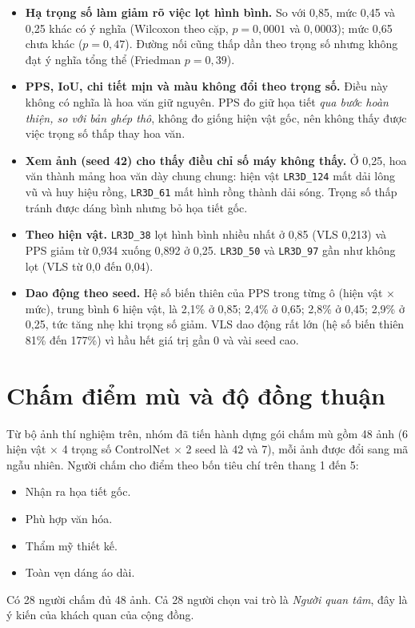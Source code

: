 \documentclass[12pt,a4paper]{report}
\begin{document}
\begin{itemize}
  \item \textbf{Hạ trọng số làm giảm rõ việc lọt hình bình.} So với 0,85, mức 0,45 và 0,25 khác có ý nghĩa (Wilcoxon theo cặp, $p=0{,}0001$ và $0{,}0003$); mức 0,65 chưa khác ($p=0{,}47$). Đường nối cũng thấp dần theo trọng số nhưng không đạt ý nghĩa tổng thể (Friedman $p=0{,}39$).
  \item \textbf{PPS, IoU, chi tiết mịn và màu không đổi theo trọng số.} Điều này không có nghĩa là hoa văn giữ nguyên. PPS đo giữ họa tiết \emph{qua bước hoàn thiện, so với bản ghép thô}, không đo giống hiện vật gốc, nên không thấy được việc trọng số thấp thay hoa văn.
  \item \textbf{Xem ảnh (seed 42) cho thấy điều chỉ số máy không thấy.} Ở 0,25, hoa văn thành mảng hoa văn dày chung chung: hiện vật \texttt{LR3D\_124} mất dải lông vũ và huy hiệu rồng, \texttt{LR3D\_61} mất hình rồng thành dải sóng. Trọng số thấp tránh được dáng bình nhưng bỏ họa tiết gốc.
  \item \textbf{Theo hiện vật.} \texttt{LR3D\_38} lọt hình bình nhiều nhất ở 0,85 (VLS 0,213) và PPS giảm từ 0,934 xuống 0,892 ở 0,25. \texttt{LR3D\_50} và \texttt{LR3D\_97} gần như không lọt (VLS từ 0,0 đến 0,04).
  \item \textbf{Dao động theo seed.} Hệ số biến thiên của PPS trong từng ô (hiện vật $\times$ mức), trung bình 6 hiện vật, là 2,1\% ở 0,85; 2,4\% ở 0,65; 2,8\% ở 0,45; 2,9\% ở 0,25, tức tăng nhẹ khi trọng số giảm. VLS dao động rất lớn (hệ số biến thiên 81\% đến 177\%) vì hầu hết giá trị gần 0 và vài seed cao.
\end{itemize}

\section{Chấm điểm mù và độ đồng thuận}

Từ bộ ảnh thí nghiệm trên, nhóm đã tiến hành dựng gói chấm mù gồm 48 ảnh (6 hiện vật $\times$ 4 trọng số ControlNet $\times$ 2 seed là 42 và 7), mỗi ảnh được đổi sang mã ngẫu nhiên. Người chấm cho điểm theo bốn tiêu chí trên thang 1 đến 5: 
\begin{itemize}
  \item Nhận ra họa tiết gốc.
  \item Phù hợp văn hóa.
  \item Thẩm mỹ thiết kế.
  \item Toàn vẹn dáng áo dài.
\end{itemize}
Có 28 người chấm đủ 48 ảnh. Cả 28 người chọn vai trò là \emph{Người quan tâm}, đây là ý kiến của khách quan của cộng đồng.
\end{document}
